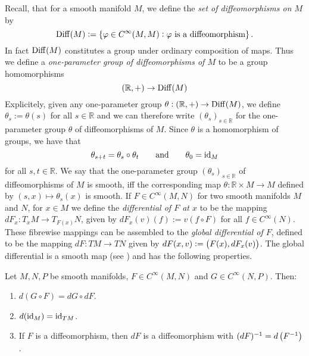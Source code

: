 Recall, that for a smooth manifold $M$, we define the \emph{set of diffeomorphisms on $M$} by
\begin{equation*}
	\Diff(M) := \cbr[0]{\varphi \in C^{\infty}(M,M) : \varphi \text{ is a diffeomorphism}}.
\end{equation*}
In fact $\operatorname{Diff}(M)$ constitutes a group under ordinary composition of maps. Thus we define a \emph{one-parameter group of diffeomorphisms of $M$} to be a group homomorphisms 
\begin{equation*}
	(\mathbb{R},+) \to \operatorname{Diff}(M)
\end{equation*}
Explicitely, given any one-parameter group $\theta : (\mathbb{R},+) \to \operatorname{Diff}(M)$, we define $\theta_s := \theta(s)$ for all $s \in \mathbb{R}$ and we can therefore write $(\theta_s)_{s \in \mathbb{R}}$ for the one-parameter group $\theta$ of diffeomorphisms of $M$. Since $\theta$ is a homomorphism of groups, we have that
\begin{equation*}
	\theta_{s + t} = \theta_s \circ \theta_t \qquad \text{and} \qquad \theta_0 = \operatorname{id}_M
\end{equation*}
\noindent for all $s,t \in \mathbb{R}$. We say that the one-parameter group $(\theta_s)_{s \in \mathbb{R}}$ of diffeomorphisms of $M$ is smooth, iff the corresponding map $\theta : \mathbb{R} \times M \to M$ defined by $(s,x) \mapsto \theta_s(x)$ is smooth. If $F \in C^\infty(M,N)$ for two smooth manifolds $M$ and $N$, for $x \in M$ we define the \emph{differential of $F$ at $x$} to be the mapping $dF_x : T_xM \to T_{F(x)}N$, given by $dF_x(v)(f) := v(f \circ F)$ for all $f \in C^\infty(N)$. These fibrewise mappings can be assembled to the \emph{global differential of $F$}, defined to be the mapping $dF : TM \to TN$ given by $dF(x,v) := \del[1]{F(x),dF_x(v)}$. The global differential is a smooth map (see \cite[68]{lee:smooth_manifolds:2013}) and has the following properties. 

\begin{proposition}
	\label{prop:properties_of_the_global_differential}
	Let $M,N,P$ be smooth manifolds, $F \in C^\infty(M,N)$ and $G \in C^\infty(N,P)$. Then:
	\begin{enumerate}[label = \textup{(\alph*)},leftmargin=*]
		\item $d(G \circ F) = dG \circ dF$.
		\item $d(\operatorname{id}_M) = \operatorname{id}_{TM}$.
		\item If $F$ is a diffeomorphism, then $dF$ is a diffeomorphism with $(dF)^{-1} = d\del[1]{F^{-1}}$.
	\end{enumerate} 
\end{proposition}

